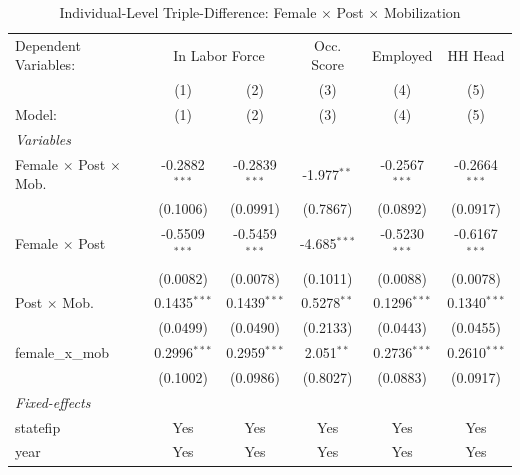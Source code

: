 
\begin{table}[htbp]
   \caption{\label{tab:triple} Individual-Level Triple-Difference: Female $\times$ Post $\times$ Mobilization}
   \centering
   \begin{tabular}{lccccc}
      \tabularnewline \midrule \midrule
      Dependent Variables: & \multicolumn{2}{c}{In Labor Force} & Occ. Score & Employed & HH Head\\
                                           & (1)             & (2)             & (3)            & (4)             & (5) \\   
      Model:                               & (1)             & (2)             & (3)            & (4)             & (5)\\  
      \midrule
      \emph{Variables}\\
      Female $\times$ Post $\times$ Mob.   & -0.2882$^{***}$ & -0.2839$^{***}$ & -1.977$^{**}$  & -0.2567$^{***}$ & -0.2664$^{***}$\\   
                                           & (0.1006)        & (0.0991)        & (0.7867)       & (0.0892)        & (0.0917)\\   
      Female $\times$ Post                 & -0.5509$^{***}$ & -0.5459$^{***}$ & -4.685$^{***}$ & -0.5230$^{***}$ & -0.6167$^{***}$\\   
                                           & (0.0082)        & (0.0078)        & (0.1011)       & (0.0088)        & (0.0078)\\   
      Post $\times$ Mob.                   & 0.1435$^{***}$  & 0.1439$^{***}$  & 0.5278$^{**}$  & 0.1296$^{***}$  & 0.1340$^{***}$\\   
                                           & (0.0499)        & (0.0490)        & (0.2133)       & (0.0443)        & (0.0455)\\   
      female\_x\_mob                       & 0.2996$^{***}$  & 0.2959$^{***}$  & 2.051$^{**}$   & 0.2736$^{***}$  & 0.2610$^{***}$\\   
                                           & (0.1002)        & (0.0986)        & (0.8027)       & (0.0883)        & (0.0917)\\   
      \midrule
      \emph{Fixed-effects}\\
      statefip                             & Yes             & Yes             & Yes            & Yes             & Yes\\  
      year                                 & Yes             & Yes             & Yes            & Yes             & Yes\\  

\end{tabular}
\end{table}

